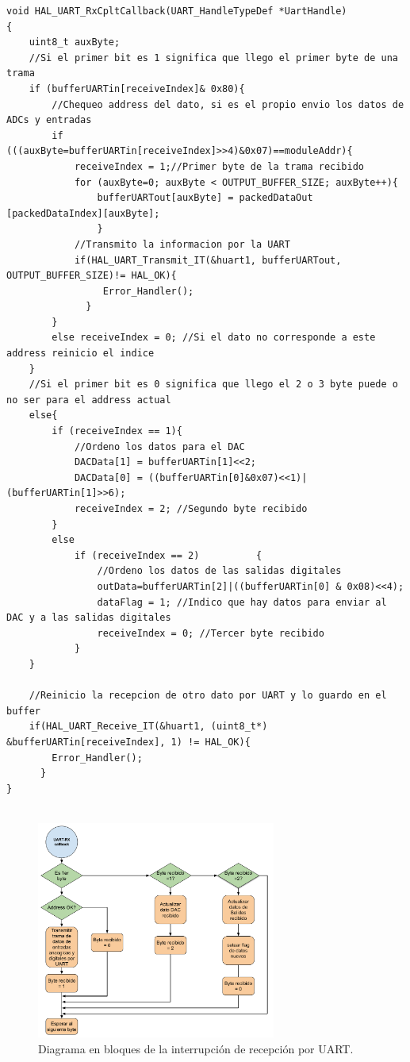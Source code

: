 \begin{lstlisting}[label=cod:codigoUART, caption= Codigo del callback de interrupción de recepción por UART.]
void HAL_UART_RxCpltCallback(UART_HandleTypeDef *UartHandle)
{
	uint8_t auxByte;
	//Si el primer bit es 1 significa que llego el primer byte de una trama
	if (bufferUARTin[receiveIndex]& 0x80){
		//Chequeo address del dato, si es el propio envio los datos de ADCs y entradas
		if (((auxByte=bufferUARTin[receiveIndex]>>4)&0x07)==moduleAddr){
			receiveIndex = 1;//Primer byte de la trama recibido
			for (auxByte=0; auxByte < OUTPUT_BUFFER_SIZE; auxByte++){
				bufferUARTout[auxByte] = packedDataOut [packedDataIndex][auxByte];
				}
			//Transmito la informacion por la UART
			if(HAL_UART_Transmit_IT(&huart1, bufferUARTout, OUTPUT_BUFFER_SIZE)!= HAL_OK){
				 Error_Handler();
			  }
		}
		else receiveIndex = 0; //Si el dato no corresponde a este address reinicio el indice
	}
	//Si el primer bit es 0 significa que llego el 2 o 3 byte puede o no ser para el address actual
	else{
		if (receiveIndex == 1){
			//Ordeno los datos para el DAC
			DACData[1] = bufferUARTin[1]<<2; 
			DACData[0] = ((bufferUARTin[0]&0x07)<<1)|(bufferUARTin[1]>>6); 
			receiveIndex = 2; //Segundo byte recibido
		}
		else
			if (receiveIndex == 2)			{
				//Ordeno los datos de las salidas digitales
				outData=bufferUARTin[2]|((bufferUARTin[0] & 0x08)<<4);
				dataFlag = 1; //Indico que hay datos para enviar al DAC y a las salidas digitales
				receiveIndex = 0; //Tercer byte recibido
			}
	}

	//Reinicio la recepcion de otro dato por UART y lo guardo en el buffer
	if(HAL_UART_Receive_IT(&huart1, (uint8_t*) &bufferUARTin[receiveIndex], 1) != HAL_OK){
	    Error_Handler();
	  }
}


\end{lstlisting}

\begin{figure}[ht]
	\centering
	\includegraphics[width=0.7\textwidth]{./Figures/BloquesUart.pdf}
	\caption{Diagrama en bloques de la interrupción de recepción por UART.}
	\label{fig:BloquesUart}
\end{figure}


